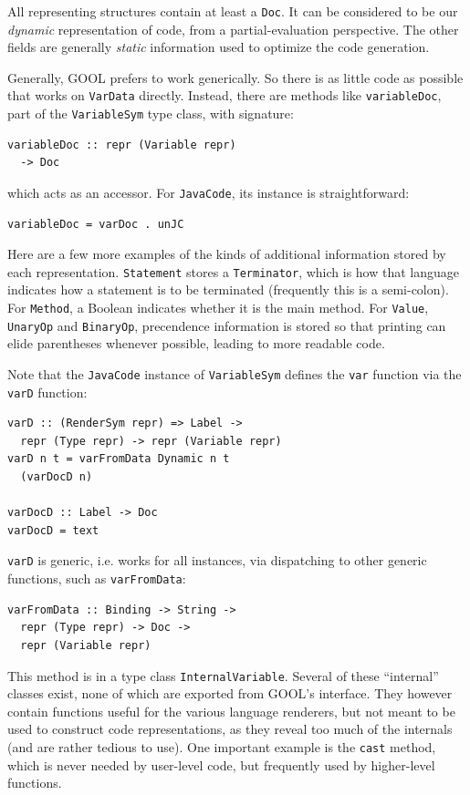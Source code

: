 \documentclass[sigplan,review,anonymous,prologue,dvipsnames]{acmart}
\begin{document}
All representing structures contain at least a \verb|Doc|. It can be considered
to be our \emph{dynamic} representation of code, from a partial-evaluation
perspective. The other fields are generally \emph{static} information used to
optimize the code generation.

Generally, GOOL prefers to work generically. So there is as little code as
possible that works on \verb|VarData| directly.  Instead, there are
methods like \verb|variableDoc|, part of the \verb|VariableSym| type class,
with signature:
\begin{lstlisting}
variableDoc :: repr (Variable repr)
  -> Doc
\end{lstlisting}
which acts as an accessor.  For \verb|JavaCode|, its instance is
straightforward:
\begin{lstlisting}
variableDoc = varDoc . unJC
\end{lstlisting}

Here are a few more examples of the kinds of additional information stored by
each representation. \verb|Statement| stores a
\verb|Terminator|, which is how that language indicates how a statement is to be
terminated (frequently this is a semi-colon).  For \verb|Method|, a Boolean
indicates whether it is the main method.  For \verb|Value|, \verb|UnaryOp|
and \verb|BinaryOp|, precendence information is stored so that printing can
elide parentheses whenever possible, leading to more readable code.

Note that the \verb|JavaCode| instance of \verb|VariableSym| defines the
\verb|var| function via the \verb|varD| function:
\begin{lstlisting}
varD :: (RenderSym repr) => Label ->
  repr (Type repr) -> repr (Variable repr)
varD n t = varFromData Dynamic n t
  (varDocD n)

varDocD :: Label -> Doc
varDocD = text
\end{lstlisting}
\verb|varD| is generic, i.e. works for all instances, via dispatching to other
generic functions, such as \verb|varFromData|:
\begin{lstlisting}
varFromData :: Binding -> String ->
  repr (Type repr) -> Doc ->
  repr (Variable repr)
\end{lstlisting}
This method is in a type class \verb|InternalVariable|. Several of these
``internal'' classes exist, none of which are exported from GOOL's interface.
They however contain functions useful for the various language renderers, but
not meant to be used to construct code representations, as they reveal too
much of the internals (and are rather tedious to use).  One important
example is the \verb|cast| method, which is never needed by user-level code,
but frequently used by higher-level functions.
\end{document}
